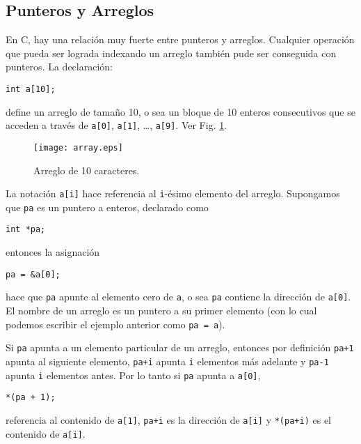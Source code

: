 \documentclass[12pt,a4paper,spanish]{article}
\begin{document}
\subsection*{Punteros y Arreglos}

En \textsf{C}, hay una relación muy fuerte entre punteros y arreglos.
Cualquier operación que pueda ser lograda indexando un arreglo también
pude ser conseguida con punteros. La declaración:

\begin{verbatim}
int a[10];
\end{verbatim}

define un arreglo de tamaño 10, o sea un bloque de 10 enteros
consecutivos que se acceden a través de \verb+a[0]+, \verb+a[1]+,
\ldots, \verb+a[9]+. Ver Fig. \ref{fig:array}.

\begin{figure}[htbp]
\begin{center}
\texttt{[image: array.eps]}
\caption{Arreglo de 10 caracteres.}
\label{fig:array}
\end{center}
\end{figure}

La notación \verb+a[i]+ hace referencia al \verb+i+-ésimo elemento del arreglo.
Supongamos que \verb+pa+ es un puntero a enteros, declarado como

\begin{verbatim}
int *pa;
\end{verbatim}

entonces la asignación

\begin{verbatim}
pa = &a[0];
\end{verbatim}

hace que \verb+pa+ apunte al elemento cero de \verb+a+, o sea \verb+pa+
contiene la dirección de \verb+a[0]+. El nombre de un arreglo es un
puntero a su primer elemento (con lo cual podemos escribir el ejemplo anterior
como \verb|pa = a|).

Si \verb+pa+ apunta a un elemento particular de un arreglo, entonces por
definición \verb-pa+1- apunta al siguiente elemento, \verb-pa+i- apunta
\verb+i+ elementos más adelante y \verb+pa-1+ apunta \verb+i+ elementos
antes. Por lo tanto si \verb+pa+ apunta a \verb+a[0]+,

\begin{verbatim}
*(pa + 1);
\end{verbatim}

referencia al contenido de \verb+a[1]+, \verb-pa+i- es la dirección de
\verb+a[i]+ y \verb-*(pa+i)- es el contenido de \verb+a[i]+.
\end{document}
